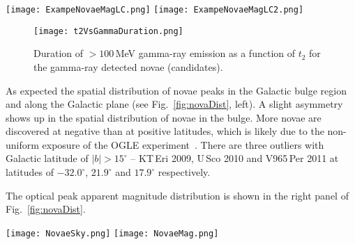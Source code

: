 \documentclass{aa} %
\begin{document}
\begin{figure*}[htp]
  \centering
 \texttt{[image: ExampeNovaeMagLC.png]}
 \texttt{[image: ExampeNovaeMagLC2.png]}
  \caption{\small Example optical light curves for 6 out of the 75 inspected novae. Observations reported by different telescopes and observers are shown in different colors.}
 \label{fig:novaLC}
\end{figure*}

\begin{figure}[htp]
  \centering
 \texttt{[image: t2VsGammaDuration.png]}
  \caption{\small Duration of $>100$\,MeV gamma-ray emission as a function of $t_2$ for the gamma-ray detected novae (candidates).}
 \label{fig:t2VsDur}
\end{figure}


As expected the spatial distribution of novae peaks in the Galactic bulge region and along the Galactic plane (see Fig.~\ref{fig:novaDist}, left). 
A slight asymmetry shows up in the spatial distribution of novae in the bulge. More novae are discovered at negative than at positive latitudes, which is likely due to the non-uniform exposure of the OGLE experiment~\citep[see Fig. 9 of][]{OGLEREF2}. There are three outliers with Galactic latitude of $|b|>15^\circ$ -- KT\,Eri 2009, U\,Sco 2010 and V965\,Per 2011 at latitudes of $-32.0^\circ$, $21.9^\circ$ and $17.9^\circ$ respectively.

The optical peak apparent magnitude distribution is shown in the right panel of Fig.~\ref{fig:novaDist}.

\begin{figure*}
\begin{center}
\texttt{[image: NovaeSky.png]}
\texttt{[image: NovaeMag.png]}
\noindent
\caption{\small Novae selected in a time range from August 2008 to the end of 2015. Left: Spatial distribution in Galactic coordinates of the novae listed in Tab.~\ref{tab:novaeList}. Previously detected gamma-ray novae are shown in red. Right: Optical peak apparent magnitude distribution of the novae, magnitudes of the five out of the six previously detected gamma-ray novae are overlayed in red. The peak magnitude of V959\,Mon is not included because it has not been measured since the nova was too close to the Sun to be observed during its outburst. Most magnitudes are in V-band. Peak magnitudes of novae which were only observed in I-band are displayed by striped bars.}
\label{fig:novaDist}
\end{center}
\end{figure*}
\end{document}

